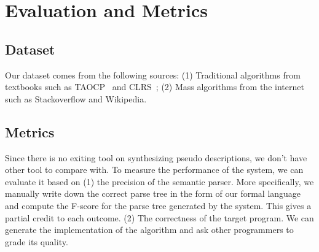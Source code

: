 \documentclass[11pt]{article}
\begin{document}
\section{Evaluation and Metrics}

\subsection{Dataset}

Our dataset comes from the following sources: (1) Traditional algorithms 
from textbooks such as TAOCP~\cite{knuth1998art} and CLRS~\cite{clrs}; (2) Mass algorithms from the internet
 such as Stackoverflow and Wikipedia.  

\subsection{Metrics}
Since there is no exiting tool on synthesizing pseudo descriptions, we don't have other tool to compare with. 
To measure the performance of the system, we can evaluate it based on (1) 
the precision of the semantic parser. More specifically,
we manually write down the correct parse tree in the form of our formal language 
and compute the F-score for the parse tree generated by the system. This gives a partial credit to each outcome.
(2) The correctness of the target program. We can generate the implementation of 
the algorithm and ask other programmers to grade its quality.




\end{document}
